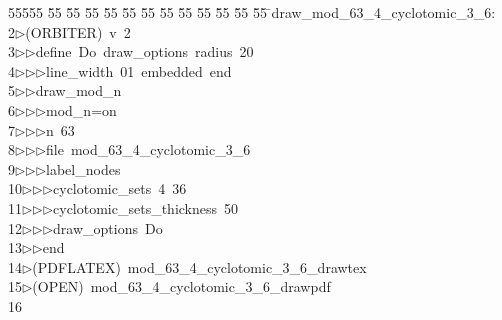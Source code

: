 %
%
\begin{tabbing}
55555 \= 55 \= 55 \= 55 \= 55 \= 55 \= 55 \= 55 \= 55 \= 55 \= 55 \= 55 \= 55 \= \>draw\_mod\_63\_4\_cyclotomic\_3\_6:\\[0pt]
2\>$\triangleright$\>(ORBITER)\ v\ 2\ \\[0pt]
3\>$\triangleright$\>$\triangleright$\>define\ Do\ draw\_options\ radius\ 20\ \\[0pt]
4\>$\triangleright$\>$\triangleright$\>$\triangleright$\>line\_width\ 01\ embedded\ end\ \\[0pt]
5\>$\triangleright$\>$\triangleright$\>draw\_mod\_n\ \\[0pt]
6\>$\triangleright$\>$\triangleright$\>$\triangleright$\>mod\_n=on\ \\[0pt]
7\>$\triangleright$\>$\triangleright$\>$\triangleright$\>n\ 63\ \\[0pt]
8\>$\triangleright$\>$\triangleright$\>$\triangleright$\>file\ mod\_63\_4\_cyclotomic\_3\_6\ \\[0pt]
9\>$\triangleright$\>$\triangleright$\>$\triangleright$\>label\_nodes\ \\[0pt]
10\>$\triangleright$\>$\triangleright$\>$\triangleright$\>cyclotomic\_sets\ 4\ 36\ \\[0pt]
11\>$\triangleright$\>$\triangleright$\>$\triangleright$\>cyclotomic\_sets\_thickness\ 50\ \\[0pt]
12\>$\triangleright$\>$\triangleright$\>$\triangleright$\>draw\_options\ Do\ \\[0pt]
13\>$\triangleright$\>$\triangleright$\>end\\[0pt]
14\>$\triangleright$\>(PDFLATEX)\ mod\_63\_4\_cyclotomic\_3\_6\_drawtex\\[0pt]
15\>$\triangleright$\>(OPEN)\ mod\_63\_4\_cyclotomic\_3\_6\_drawpdf\\[0pt]
16\>\end{tabbing}
